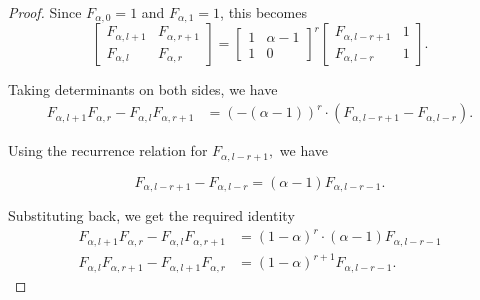 \documentclass[10pt,a4paper]{amsart}
\begin{document}
\begin{proof}
		Since $F_{\alpha,0} = 1$ and $F_{\alpha,1} = 1$, this becomes
		\[
		\begin{bmatrix}
			F_{\alpha,l+1} & F_{\alpha,r+1} \\
			F_{\alpha,l}   & F_{\alpha,r}
		\end{bmatrix}
		=
		\begin{bmatrix}
			1 & \alpha-1 \\
			1 & 0
		\end{bmatrix}^{r}
		\begin{bmatrix}
			F_{\alpha,l-r+1} & 1 \\
			F_{\alpha,l-r}   & 1
		\end{bmatrix}.
		\]
		
		Taking determinants on both sides, we have
		\begin{align*}
			F_{\alpha,l+1}F_{\alpha,r} - F_{\alpha,l}F_{\alpha,r+1}
			&=
			\left(-(\alpha-1) \right)^r
			\cdot
			\left( F_{\alpha,l-r+1} - F_{\alpha,l-r} \right).
		\end{align*}
		
		
		Using the recurrence relation for $F_{\alpha,l-r+1},$ we have
		
		\[
		F_{\alpha,l-r+1} - F_{\alpha,l-r} = (\alpha-1)F_{\alpha,l-r-1}.
		\]
		
		Substituting back, we get the required identity
		\begin{align*}
			F_{\alpha,l+1}F_{\alpha,r} - F_{\alpha,l}F_{\alpha,r+1}
			&= (1-\alpha)^r \cdot (\alpha-1)F_{\alpha,l-r-1}\\
			F_{\alpha,l}F_{\alpha,r+1} - F_{\alpha,l+1}F_{\alpha,r}
			&=  (1-\alpha)^{r+1} F_{\alpha,l-r-1}.
		\end{align*}
		
	\end{proof}
\end{document}
